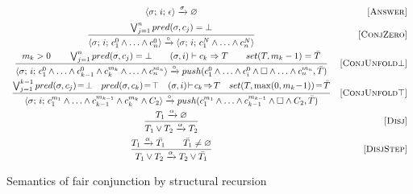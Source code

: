\begin{figure}[h!]
\[\begin{array}{cr}

      {\inbr{\sigma;\, i;\, \epsilon} \xrightarrow{\sigma} \emptyset}  
&     \ruleno{Answer} \\[2mm]
\dfrac{\bigvee_{j=1}^n pred(\sigma, c_j) = \bot}
      {\inbr{\sigma;\, i;\, c_1^0 \land \ldots \land c_n^0} \xrightarrow{\circ} \inbr{\sigma;\, i;\, c_1^N \land \ldots \land c_n^N}}
&     \ruleno{ConjZero} \\[4mm]
\dfrac{m_k > 0 \qquad \bigvee_{j=1}^n pred(\sigma, c_j) = \bot \qquad (\sigma, i) \vdash c_k \Rightarrow T \qquad set(T, m_k - 1) = \bar{T}}
      {\inbr{\sigma;\, i;\, c_1^0 \land \ldots \land c_{k-1}^0 \land c_k^{m_k} \land \ldots \land c_n^{m_n}} \xrightarrow{\circ} push(c_1^0 \land \ldots \land c_i^0 \land \Box \land \ldots \land c_n^{m_n}, \bar{T})}
&     \ruleno{ConjUnfold$\bot$} \\[4mm]
\dfrac{\bigvee_{j=1}^{k-1} pred(\sigma, c_j)\! =\! \bot \quad pred(\sigma, c_k) \!=\! \top \quad (\sigma, i) \!\vdash\! c_k \!\Rightarrow\! T \quad set(T, \max(0, m_k \!-\! 1)) \!=\! \bar{T}}
      {\inbr{\sigma;\, i;\, c_1^{m_1} \land \ldots \land c_{k-1}^{m_{k-1}} \land c_k^{m_k} \land C_2} \xrightarrow{\circ} push(c_1^{m_1} \land \ldots \land c_{k-1}^{m_{k-1}} \land \Box \land C_2, \bar{T})}
&     \ruleno{ConjUnfold$\top$} \\[4mm]
\dfrac{T_1 \xrightarrow{\alpha} \emptyset}
      {T_1 \lor T_2 \xrightarrow{\alpha} T_2}
&     \ruleno{Disj} \\[4mm]
\dfrac{T_1 \xrightarrow{\alpha} \bar{T_1} \qquad \bar{T_1} \not= \emptyset}
      {T_1 \lor T_2 \xrightarrow{\alpha} T_2 \lor\bar{T_1}}
&     \ruleno{DisjStep}
\end{array}\]
\caption{Semantics of fair conjunction by structural recursion}
\label{fair:structural-recursion-semantics}
\end{figure}


